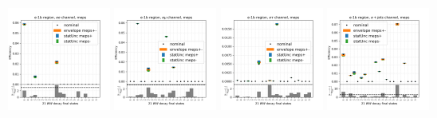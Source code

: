 \begin{figure}
    \includegraphics[width=0.24\textwidth]{chapters/Appendix/sectionTTSyst/figures/afterCorr/icata2_ch0_meps.png}
    \includegraphics[width=0.24\textwidth]{chapters/Appendix/sectionTTSyst/figures/afterCorr/icata2_ch1_meps.png}
    \includegraphics[width=0.24\textwidth]{chapters/Appendix/sectionTTSyst/figures/afterCorr/icata2_ch2_meps.png}
    \includegraphics[width=0.24\textwidth]{chapters/Appendix/sectionTTSyst/figures/afterCorr/icata2_ch3_meps.png}


\end{figure}
